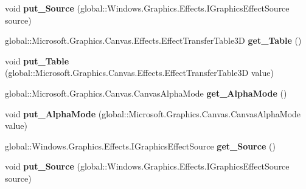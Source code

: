 \begin{DoxyCompactItemize}
void {\bfseries put\+\_\+\+Source} (global\+::\+Windows.\+Graphics.\+Effects.\+I\+Graphics\+Effect\+Source source)
\item 
\mbox{\label{interface_microsoft_1_1_graphics_1_1_canvas_1_1_effects_1_1_i_table_transfer3_d_effect_af4748ae4647dd78f75a59a61b482fc70}} 
global\+::\+Microsoft.\+Graphics.\+Canvas.\+Effects.\+Effect\+Transfer\+Table3D {\bfseries get\+\_\+\+Table} ()
\item 
\mbox{\label{interface_microsoft_1_1_graphics_1_1_canvas_1_1_effects_1_1_i_table_transfer3_d_effect_ab603763a514a44367ea6108e1369168a}} 
void {\bfseries put\+\_\+\+Table} (global\+::\+Microsoft.\+Graphics.\+Canvas.\+Effects.\+Effect\+Transfer\+Table3D value)
\item 
\mbox{\label{interface_microsoft_1_1_graphics_1_1_canvas_1_1_effects_1_1_i_table_transfer3_d_effect_a21d268378aa27ae6ca1034dd0f7299ca}} 
global\+::\+Microsoft.\+Graphics.\+Canvas.\+Canvas\+Alpha\+Mode {\bfseries get\+\_\+\+Alpha\+Mode} ()
\item 
\mbox{\label{interface_microsoft_1_1_graphics_1_1_canvas_1_1_effects_1_1_i_table_transfer3_d_effect_a2acd84164258602c46fd7ad7701b2a6b}} 
void {\bfseries put\+\_\+\+Alpha\+Mode} (global\+::\+Microsoft.\+Graphics.\+Canvas.\+Canvas\+Alpha\+Mode value)
\item 
\mbox{\label{interface_microsoft_1_1_graphics_1_1_canvas_1_1_effects_1_1_i_table_transfer3_d_effect_a99a72dee613feb6e1085470ab22cb3a9}} 
global\+::\+Windows.\+Graphics.\+Effects.\+I\+Graphics\+Effect\+Source {\bfseries get\+\_\+\+Source} ()
\item 
\mbox{\label{interface_microsoft_1_1_graphics_1_1_canvas_1_1_effects_1_1_i_table_transfer3_d_effect_a500a3b0cdf37153a399fb4230f6a6a3a}} 
void {\bfseries put\+\_\+\+Source} (global\+::\+Windows.\+Graphics.\+Effects.\+I\+Graphics\+Effect\+Source source)

\end{DoxyCompactItemize}
